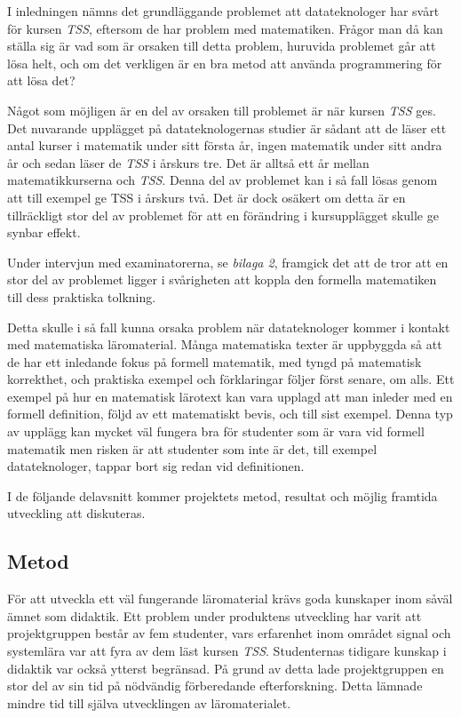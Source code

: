\documentclass[]{article}
\begin{document}
I inledningen nämns det grundläggande problemet att datateknologer har svårt för kursen \textit{TSS}, eftersom de har problem
med matematiken. Frågor man då kan ställa sig är vad som är orsaken till detta problem, huruvida problemet går att lösa
helt, och om det verkligen är en bra metod att använda programmering för att lösa det?

Något som möjligen är en del av orsaken till problemet är när kursen \textit{TSS} ges. Det nuvarande upplägget på
datateknologernas studier är sådant att de läser ett antal kurser i matematik under sitt första år, ingen matematik
under sitt andra år och sedan läser de \textit{TSS} i årskurs tre. Det är alltså ett år mellan matematikkurserna och
\textit{TSS}. Denna del av problemet kan i så fall lösas genom att till exempel ge TSS i årskurs två. Det är dock
osäkert om detta är en tillräckligt stor del av problemet för att en förändring i kursupplägget skulle ge synbar effekt.

Under intervjun med examinatorerna, se \textit{bilaga 2}, framgick det att de tror att en stor del av problemet ligger i
svårigheten att koppla den formella matematiken till dess praktiska tolkning.

Detta skulle i så fall kunna orsaka problem när datateknologer kommer i kontakt med matematiska läromaterial. Många
matematiska texter är uppbyggda så att de har ett inledande fokus på formell matematik, med tyngd på matematisk
korrekthet, och praktiska exempel och förklaringar följer först senare, om alls. Ett exempel på hur en matematisk
lärotext kan vara upplagd att man inleder med en formell definition, följd av ett matematiskt bevis, och till sist
exempel. Denna typ av upplägg kan mycket väl fungera bra för studenter som är vara vid formell matematik men risken är
att studenter som inte är det, till exempel datateknologer, tappar bort sig redan vid definitionen.

I de följande delavsnitt kommer projektets metod, resultat och möjlig framtida utveckling att diskuteras.

\subsection{Metod}
För att utveckla ett väl fungerande läromaterial krävs goda kunskaper inom såväl ämnet som didaktik. Ett problem under
produktens utveckling har varit att projektgruppen består av fem studenter, vars erfarenhet inom området signal och
systemlära var att fyra av dem läst kursen \textit{TSS}. Studenternas tidigare kunskap i didaktik var också ytterst
begränsad. På grund av detta lade projekt\-gruppen en stor del av sin tid på nödvändig förberedande efterforskning. Detta
lämnade mindre tid till själva utvecklingen av läromaterialet.
\end{document}
